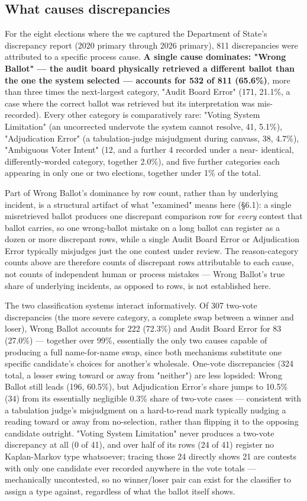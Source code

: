 \subsection{What causes discrepancies}

For the eight elections where the we captured the Department of State's
discrepancy report (2020 primary through 2026 primary),
811 discrepancies were attributed to a specific
process cause. \textbf{A single cause dominates: "Wrong Ballot" — the audit
board physically retrieved a different ballot than the one the system
selected — accounts for 532 of 811 (65.6\%)}, more than three times the
next-largest category, "Audit Board Error" (171, 21.1\%, a case where the
correct ballot was retrieved but its interpretation was mis-recorded).
Every other category is comparatively rare: "Voting System Limitation" (an
uncorrected undervote the system cannot resolve, 41, 5.1\%), "Adjudication
Error" (a tabulation-judge misjudgment during canvass, 38, 4.7\%),
"Ambiguous Voter Intent" (12, and a further 4 recorded under a near-
identical, differently-worded category, together 2.0\%), and five further
categories each appearing in only one or two elections, together under 1\%
of the total.

Part of Wrong Ballot's dominance by row count, rather than by underlying
incident, is a structural artifact of what "examined" means here (§6.1):
a single misretrieved ballot produces one discrepant comparison row for
\textit{every} contest that ballot carries, so one wrong-ballot mistake on a
long ballot can register as a dozen or more discrepant rows, while a
single Audit Board Error or Adjudication Error typically misjudges just
the one contest under review. The reason-category counts above are
therefore counts of discrepant rows attributable to each cause, not
counts of independent human or process mistakes — Wrong Ballot's true
share of underlying incidents, as opposed to rows, is not established
here.

The two classification systems interact informatively. Of 307 two-vote
discrepancies (the more severe category, a complete swap between a
winner and loser), Wrong Ballot accounts for 222 (72.3\%) and
Audit Board Error for 83 (27.0\%) — together over 99\%, essentially the only
two causes capable of producing a full name-for-name swap, since both
mechanisms substitute one specific candidate's choices for another's
wholesale. One-vote discrepancies (324 total, a lesser swing toward or
away from "neither") are less lopsided: Wrong Ballot still leads (196,
60.5\%), but Adjudication Error's share jumps to 10.5\% (34) from its
essentially negligible 0.3\% share of two-vote cases — consistent with a
tabulation judge's misjudgment on a hard-to-read mark typically nudging a
reading toward or away from no-selection, rather than flipping it to the
opposing candidate outright. "Voting System Limitation" never produces a
two-vote discrepancy at all (0 of 41), and over half of its rows (24 of
41) register no Kaplan-Markov type whatsoever; tracing those 24 directly
shows 21 are contests with only one candidate ever recorded anywhere in
the vote totals — mechanically uncontested, so no winner/loser pair can
exist for the classifier to assign a type against, regardless of what the
ballot itself shows.

